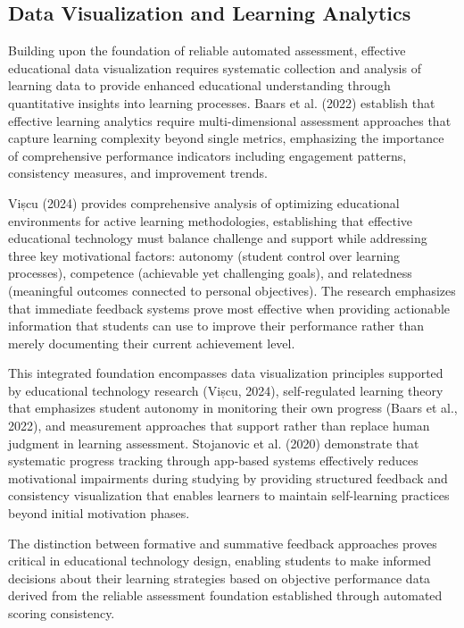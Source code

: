 \subsection{Data Visualization and Learning Analytics}

{\color{maroon}
Building upon the foundation of reliable automated assessment, effective educational data visualization requires systematic collection and analysis of learning data to provide enhanced educational understanding through quantitative insights into learning processes. Baars et al. (2022) establish that effective learning analytics require multi-dimensional assessment approaches that capture learning complexity beyond single metrics, emphasizing the importance of comprehensive performance indicators including engagement patterns, consistency measures, and improvement trends.

Vișcu (2024) provides comprehensive analysis of optimizing educational environments for active learning methodologies, establishing that effective educational technology must balance challenge and support while addressing three key motivational factors: autonomy (student control over learning processes), competence (achievable yet challenging goals), and relatedness (meaningful outcomes connected to personal objectives). The research emphasizes that immediate feedback systems prove most effective when providing actionable information that students can use to improve their performance rather than merely documenting their current achievement level.

This integrated foundation encompasses data visualization principles supported by educational technology research (Vișcu, 2024), self-regulated learning theory that emphasizes student autonomy in monitoring their own progress (Baars et al., 2022), and measurement approaches that support rather than replace human judgment in learning assessment. Stojanovic et al. (2020) demonstrate that systematic progress tracking through app-based systems effectively reduces motivational impairments during studying by providing structured feedback and consistency visualization that enables learners to maintain self-learning practices beyond initial motivation phases.

The distinction between formative and summative feedback approaches proves critical in educational technology design, enabling students to make informed decisions about their learning strategies based on objective performance data derived from the reliable assessment foundation established through automated scoring consistency.
}

